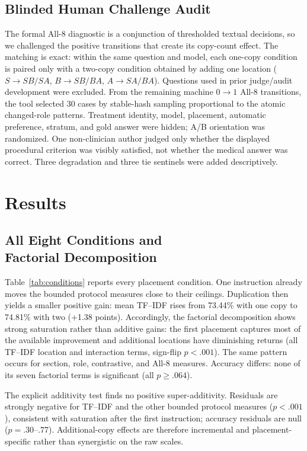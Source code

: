 \documentclass[10pt]{article}
\begin{document}
\subsection{Blinded Human Challenge Audit}
The formal All-8 diagnostic is a conjunction of thresholded textual decisions, so we challenged the positive transitions that create its copy-count effect. The matching is exact: within the same question and model, each one-copy condition is paired only with a two-copy condition obtained by adding one location ($S\rightarrow SB/SA$, $B\rightarrow SB/BA$, $A\rightarrow SA/BA$). Questions used in prior judge/audit development were excluded. From the remaining machine $0\rightarrow1$ All-8 transitions, the tool selected 30 cases by stable-hash sampling proportional to the atomic changed-role patterns. Treatment identity, model, placement, automatic preference, stratum, and gold answer were hidden; A/B orientation was randomized. One non-clinician author judged only whether the displayed procedural criterion was visibly satisfied, not whether the medical answer was correct. Three degradation and three tie sentinels were added descriptively.

\section{Results}
\subsection{All Eight Conditions and\texorpdfstring{\\}{ }Factorial Decomposition}
Table~\ref{tab:conditions} reports every placement condition. One instruction already moves the bounded protocol measures close to their ceilings. Duplication then yields a smaller positive gain: mean TF--IDF rises from 73.44\% with one copy to 74.81\% with two (+1.38 points). Accordingly, the factorial decomposition shows strong saturation rather than additive gains: the first placement captures most of the available improvement and additional locations have diminishing returns (all TF--IDF location and interaction terms, sign-flip $p<.001$). The same pattern occurs for section, role, contrastive, and All-8 measures. Accuracy differs: none of its seven factorial terms is significant (all $p\ge .064$).

The explicit additivity test finds no positive super-additivity. Residuals are strongly negative for TF--IDF and the other bounded protocol measures ($p<.001$), consistent with saturation after the first instruction; accuracy residuals are null ($p=.30$--$.77$). Additional-copy effects are therefore incremental and placement-specific rather than synergistic on the raw scales.
\end{document}
